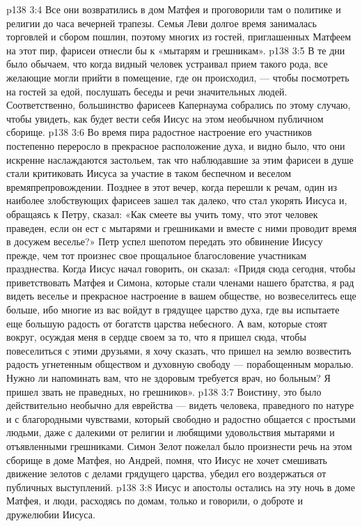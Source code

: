 \vs p138 3:4 \pc Все они возвратились в дом Матфея и проговорили там о политике и религии до часа вечерней трапезы. Семья Леви долгое время занималась торговлей и сбором пошлин, поэтому многих из гостей, приглашенных Матфеем на этот пир, фарисеи отнесли бы к «мытарям и грешникам».
\vs p138 3:5 В те дни было обычаем, что когда видный человек устраивал прием такого рода, все желающие могли прийти в помещение, где он происходил, --- чтобы посмотреть на гостей за едой, послушать беседы и речи значительных людей. Соответственно, большинство фарисеев Капернаума собрались по этому случаю, чтобы увидеть, как будет вести себя Иисус на этом необычном публичном сборище.
\vs p138 3:6 Во время пира радостное настроение его участников постепенно переросло в прекрасное расположение духа, и видно было, что они искренне наслаждаются застольем, так что наблюдавшие за этим фарисеи в душе стали критиковать Иисуса за участие в таком беспечном и веселом времяпрепровождении. Позднее в этот вечер, когда перешли к речам, один из наиболее злобствующих фарисеев зашел так далеко, что стал укорять Иисуса и, обращаясь к Петру, сказал: «Как смеете вы учить тому, что этот человек праведен, если он ест с мытарями и грешниками и вместе с ними проводит время в досужем веселье?» Петр успел шепотом передать это обвинение Иисусу прежде, чем тот произнес свое прощальное благословение участникам празднества. Когда Иисус начал говорить, он сказал: «Придя сюда сегодня, чтобы приветствовать Матфея и Симона, которые стали членами нашего братства, я рад видеть веселье и прекрасное настроение в вашем обществе, но возвеселитесь еще больше, ибо многие из вас войдут в грядущее царство духа, где вы испытаете еще большую радость от богатств царства небесного. А вам, которые стоят вокруг, осуждая меня в сердце своем за то, что я пришел сюда, чтобы повеселиться с этими друзьями, я хочу сказать, что пришел на землю возвестить радость угнетенным обществом и духовную свободу --- порабощенным моралью. Нужно ли напоминать вам, что не здоровым требуется врач, но больным? Я пришел звать не праведных, но грешников».
\vs p138 3:7 Воистину, это было действительно необычно для еврейства --- видеть человека, праведного по натуре и с благородными чувствами, который свободно и радостно общается с простыми людьми, даже с далекими от религии и любящими удовольствия мытарями и отъявленными грешниками. Симон Зелот пожелал было произнести речь на этом сборище в доме Матфея, но Андрей, помня, что Иисус не хочет смешивать движение зелотов с делами грядущего царства, убедил его воздержаться от публичных выступлений.
\vs p138 3:8 Иисус и апостолы остались на эту ночь в доме Матфея, и люди, расходясь по домам, только и говорили, о доброте и дружелюбии Иисуса.
